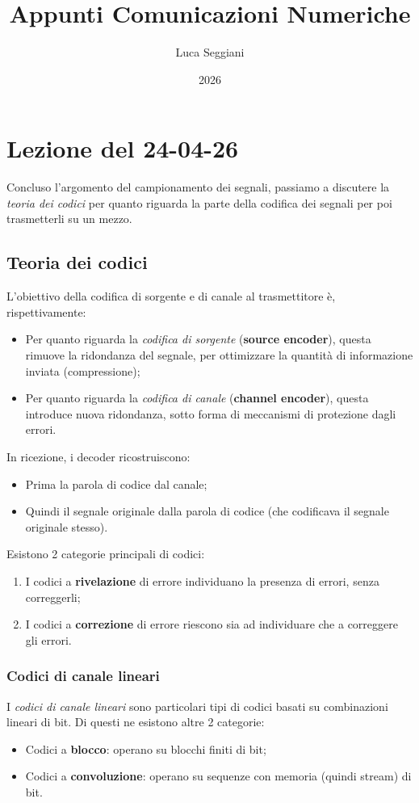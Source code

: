 \documentclass[a4paper,11pt]{article}
\title{Appunti Comunicazioni Numeriche}
\author{Luca Seggiani}
\date{2026}
\begin{document}
\section{Lezione del 24-04-26}

\thispagestyle{empty}
\pagestyle{fancy}

Concluso l'argomento del campionamento dei segnali, passiamo a discutere la \textit{teoria dei codici} per quanto riguarda la parte della codifica dei segnali per poi trasmetterli su un mezzo. 

\subsection{Teoria dei codici}
L'obiettivo della codifica di sorgente e di canale al trasmettitore è, rispettivamente:
\begin{itemize}
	\item Per quanto riguarda la \textit{codifica di sorgente} (\textbf{source encoder}), questa rimuove la ridondanza del segnale, per ottimizzare la quantità di informazione inviata (compressione);
	\item Per quanto riguarda la \textit{codifica di canale} (\textbf{channel encoder}), questa introduce nuova ridondanza, sotto forma di meccanismi di protezione dagli errori.
\end{itemize}

In ricezione, i decoder ricostruiscono:
\begin{itemize}
	\item Prima la parola di codice dal canale;
	\item Quindi il segnale originale dalla parola di codice (che codificava il segnale originale stesso).
\end{itemize}

Esistono 2 categorie principali di codici:
\begin{enumerate}
	\item I codici a \textbf{rivelazione} di errore individuano la presenza di errori, senza correggerli;
	\item I codici a \textbf{correzione} di errore riescono sia ad individuare che a correggere gli errori.
\end{enumerate}

\subsubsection{Codici di canale lineari}
I \textit{codici di canale lineari} sono particolari tipi di codici basati su combinazioni lineari di bit. Di questi ne esistono altre 2 categorie:
\begin{itemize}
	\item Codici a \textbf{blocco}: operano su blocchi finiti di bit;
	\item Codici a \textbf{convoluzione}: operano su sequenze con memoria (quindi stream) di bit.
\end{itemize}
\end{document}

